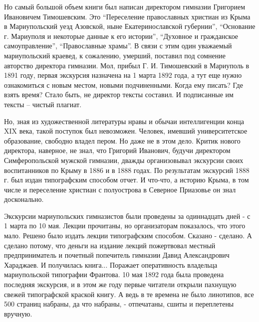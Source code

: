 
Но самый большой объем книги был написан директором гимназии Григорием
Ивановичем Тимошевским. Это \enquote{Переселение православных христиан из Крыма в
Мариупольский уезд Азовской, ныне Екатеринославской губернии}, \enquote{Основание г.
Мариуполя и некоторые данные к его истории}, \enquote{Духовное и гражданское
самоуправление}, \enquote{Православные храмы}. В связи с этим один уважаемый
мариупольский краевед, к сожалению, умерший, поставил под сомнение авторство
директора гимназии. Мол, прибыл Г. И. Тимошевский в Мариуполь в 1891 году,
первая экскурсия назначена на 1 марта 1892 года, а тут еще нужно ознакомиться с
новым местом, новыми подчиненными. Когда ему писать? Где взять время? Стало
быть, не директор тексты составил. И подписанные им тексты – чистый плагиат.


Но, зная из художественной литературы нравы и обычаи интеллигенции конца XIX
века, такой поступок был невозможен. Человек, имевший университетское
образование, свободно владел пером. Но даже не в этом дело. Критик нового
директора, наверное, не знал, что Григорий Иванович, будучи директором
Симферопольской мужской гимназии, дважды организовывал экскурсии своих
воспитанников по Крыму в 1886 и в 1888 годах. По результатам экскурсий 1888 г.
был издан типографским способом отчет. И что-что, а историю Крыма, в том числе
и переселение христиан с полуострова в Северное Приазовье он знал досконально.

Экскурсии мариупольских гимназистов были проведены за одиннадцать дней - с 1
марта по 10 мая. Лекции прочитаны, но организаторам показалось, что этого мало.
Решено было издать лекции типографским способом. Сказано - сделано. А сделано
потому, что деньги на издание лекций пожертвовал местный предприниматель и
почетный попечитель гимназии Давид Александрович Хараджаев. И получилась
книга... Поражает оперативность владельца мариупольской типографии Франтова. 10
мая 1892 года была проведена последняя экскурсия, и в этом же году первые
читатели открыли пахнущую свежей типографской краской книгу. А ведь в те
времена не было линотипов, все 500 страниц набраны, да что набраны, -
отпечатаны, сшиты и переплетены вручную.

